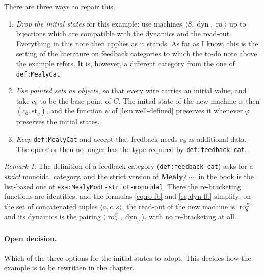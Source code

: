 \documentclass[11pt,a4paper]{article}
\theoremstyle{plain}
\theoremstyle{remark}
\newtheorem*{remark}{Remark}
\DeclareMathOperator{\dyn}{dyn}
\DeclareMathOperator{\ro}{ro}
\newcommand{\st}{\mathrm{st}}
\newcommand{\MealyMod}{\mathbf{Mealy}/{\sim}}
\newcommand{\lbl}[1]{\nolinkurl{#1}}
\begin{document}
There are three ways to repair this.

\begin{enumerate}[leftmargin=*]
    \item \emph{Drop the initial states} for this example: use machines $\langle S, \dyn, \ro \rangle$ up to bijections which are compatible with the dynamics and the read-out.
          Everything in this note then applies as it stands.
          As far as I know, this is the setting of the literature on feedback categories to which the to-do note above the example refers.
          It is, however, a different category from the one of \lbl{def:MealyCat}.
    \item \emph{Use pointed sets as objects}, so that every wire carries an initial value, and take $c_0$ to be the base point of $C$.
          The initial state of the new machine is then $(c_0, \st_g)$, and the function $\psi$ of \cref{lem:well-defined} preserves it whenever $\varphi$ preserves the initial states.
    \item \emph{Keep} \lbl{def:MealyCat} and accept that feedback needs $c_0$ as additional data.
          The operator then no longer has the type required by \lbl{def:feedback-cat}.
\end{enumerate}

\begin{remark}
    The definition of a feedback category (\lbl{def:feedback-cat}) asks for a \emph{strict} monoidal category, and the strict version of $\MealyMod$ in the book is the list-based one of \lbl{exa:MealyModL-strict-monoidal}.
    There the re-bracketing functions are identities, and the formulas \eqref{eq:ro-fb} and \eqref{eq:dyn-fb} simplify: on the set of concatenated tuples $\langle a, c, s \rangle$, the read-out of the new machine is $\ro_g^{B}$ and its dynamics is the pairing $\langle \ro_g^{C}, \dyn_g \rangle$, with no re-bracketing at all.
\end{remark}

\paragraph{Open decision.}
Which of the three options for the initial states to adopt.
This decides how the example is to be rewritten in the chapter.
\end{document}
